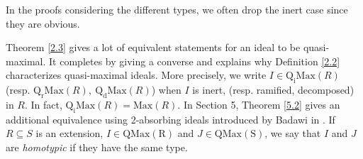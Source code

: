 \documentclass[12pt,leqno]{amsart}
\theoremstyle{definition}
\begin{document}
In the proofs considering the different types, we often drop the inert case since they are obvious.

Theorem \ref{2.3} gives a lot of equivalent statements for an ideal to be quasi-maximal. It completes \cite[Proposition 3]{AKKT} by giving a converse and explains why Definition \ref{2.2} characterizes quasi-maximal ideals. More precisely, we write $I\in\mathrm{Q_iMax}(R)$ (resp. $\mathrm {Q_r Max}(R),\ \mathrm{Q_dMax}(R)$) when $I$ is inert, (resp. ramified, decomposed) in $R$. In fact, $\mathrm{Q_iMax}(R)=\mathrm{Max}(R)$. In Section 5, Theorem \ref{5.2} gives an additional equivalence using 2-absorbing ideals introduced by Badawi in \cite{Ba}. If $R\subseteq S$ is an extension, $I\in\mathrm{QMax(R)}$ and $J\in\mathrm{QMax(S)}$, we say that $I$ and $J$ are {\it homotypic} if they have the same type.
\end{document}
